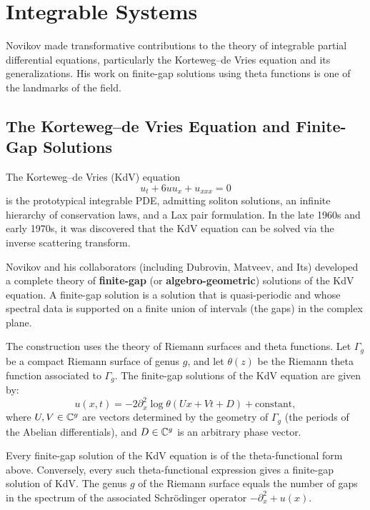 \section{Integrable Systems}

Novikov made transformative contributions to the theory of integrable partial differential equations, particularly the Korteweg--de Vries equation and its generalizations. His work on finite-gap solutions using theta functions is one of the landmarks of the field.

\subsection{The Korteweg--de Vries Equation and Finite-Gap Solutions}

The Korteweg--de Vries (KdV) equation
\[
u_t + 6u u_x + u_{xxx} = 0
\]
is the prototypical integrable PDE, admitting soliton solutions, an infinite hierarchy of conservation laws, and a Lax pair formulation. In the late 1960s and early 1970s, it was discovered that the KdV equation can be solved via the inverse scattering transform.

Novikov and his collaborators (including Dubrovin, Matveev, and Its) developed a complete theory of \textbf{finite-gap} (or \textbf{algebro-geometric}) solutions of the KdV equation. A finite-gap solution is a solution that is quasi-periodic and whose spectral data is supported on a finite union of intervals (the gaps) in the complex plane.

The construction uses the theory of Riemann surfaces and theta functions. Let \(\Gamma_g\) be a compact Riemann surface of genus \(g\), and let \(\theta(z)\) be the Riemann theta function associated to \(\Gamma_g\). The finite-gap solutions of the KdV equation are given by:
\[
u(x,t) = -2 \partial_x^2 \log \theta(Ux + Vt + D) + \text{constant},
\]
where \(U, V \in \mathbb{C}^g\) are vectors determined by the geometry of \(\Gamma_g\) (the periods of the Abelian differentials), and \(D \in \mathbb{C}^g\) is an arbitrary phase vector.

\begin{theorem}
Every finite-gap solution of the KdV equation is of the theta-functional form above. Conversely, every such theta-functional expression gives a finite-gap solution of KdV. The genus \(g\) of the Riemann surface equals the number of gaps in the spectrum of the associated Schr\"odinger operator \(-\partial_x^2 + u(x)\).
\end{theorem}

